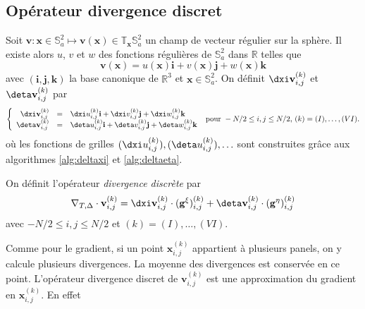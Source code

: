 \subsection{Opérateur divergence discret}

Soit $\mathbf{v} : \mathbf{x} \in \mathbb{S}_a^2 \mapsto \mathbf{v}(\mathbf{x}) \in \mathbb{T}_{\mathbf{x}} \mathbb{S}_a^2$ un champ de vecteur régulier sur la sphère. Il existe alors $u$, $v$ et $w$ des fonctions régulières de $\mathbb{S}_a^2$ dans $\mathbb{R}$ telles que
\begin{equation}
\mathbf{v}(\mathbf{x}) = u(\mathbf{x}) \mathbf{i} + v (\mathbf{x}) \mathbf{j} + w(\mathbf{x}) \mathbf{k}
\end{equation}
avec $(\mathbf{i}, \mathbf{j}, \mathbf{k})$ la base canonique de $\mathbb{R}^3$ et $\mathbf{x} \in \mathbb{S}_a^2$. On définit $\dxi \mathbf{v}_{i,j}^{(k)}$ et $\deta \mathbf{v}_{i,j}^{(k)}$ par
\begin{equation}
\left\lbrace
\begin{array}{rcl}
\dxi \mathbf{v}_{i,j}^{(k)} & = & \dxi u_{i,j}^{(k)} \mathbf{i} + \dxi v_{i,j}^{(k)} \mathbf{j} + \dxi w_{i,j}^{(k)} \mathbf{k} \\
\deta \mathbf{v}_{i,j}^{(k)} & = & \deta u_{i,j}^{(k)} \mathbf{i} + \deta v_{i,j}^{(k)} \mathbf{j} + \deta w_{i,j}^{(k)} \mathbf{k}
\end{array}
\right.
\text{ pour } -N/2 \leq  i,j \leq N/2 \text{, } (k) = (I), \ldots, (VI). 
\label{eq:der_partiel_vect}
\end{equation}
où les fonctions de grilles $(\dxi u_{i,j}^{(k)}), (\deta u_{i,j}^{(k)}),  \ldots$ sont construites grâce aux algorithmes \ref{alg:deltaxi} et \ref{alg:deltaeta}.

\begin{definition}
On définit l'opérateur \textit{divergence discrète} par 
\begin{equation}
\nabla_{T,\Delta} \cdot \mathbf{v}_{i,j}^{(k)} = \dxi \mathbf{v}_{i,j}^{(k)} \cdot ( \mathbf{g}^{\xi} )_{i,j}^{(k)} + \deta \mathbf{v}_{i,j}^{(k)} \cdot ( \mathbf{g}^{\eta} )_{i,j}^{(k)}
\end{equation}
avec $-N/2 \leq i,j \leq N/2$ et $(k) = (I), \ldots , (VI)$.
\label{def:divergence_disc}
\end{definition}
Comme pour le gradient, si un point $\mathbf{x}_{i,j}^{(k)}$ appartient à plusieurs panels, on y calcule plusieurs divergences. La moyenne des divergences est conservée en ce point.
L'opérateur divergence discret de $\mathbf{v}_{i,j}^{(k)}$ est une approximation du gradient en $\mathbf{x}_{i,j}^{(k)}$. En effet

